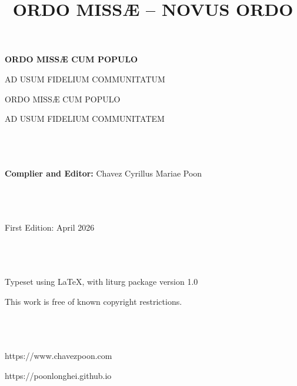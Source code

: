 \documentclass[12pt, a4paper]{article}
\title{ORDO MISSÆ -- NOVUS ORDO}
\date{}
\begin{document}
	\begin{titlepage}
		\centering
		\vspace*{3cm}
		{\Huge\bfseries ORDO MISSÆ CUM POPULO\par}
		\vspace{5cm}
		{\large AD USUM FIDELIUM COMMUNITATUM\par}
		\vfill
	\end{titlepage}
	
	\newpage
	
	\setlength{\leftskip}{0cm}
	
	{\LARGE ORDO MISSÆ CUM POPULO}
	\\
	\setlength{\leftskip}{0cm}
	
	{\large AD USUM FIDELIUM COMMUNITATEM}
	\\\\
	\\\\
	\setlength{\leftskip}{0cm}
	
	{\large \textbf{Complier and Editor:} Chavez Cyrillus Mariae Poon}
	\\\\
	\\\\
	\setlength{\leftskip}{0cm}
	
	{\large First Edition: April 2026}
	\\\\
	\\\\
	\setlength{\leftskip}{0cm}
	
	{\large Typeset using \LaTeX, with liturg package version 1.0}
	\\
	\setlength{\leftskip}{0cm}
	
	{\large This work is free of known copyright restrictions.}
	\\\\
	\\\\
	\setlength{\leftskip}{0cm}
	
	{\large https://www.chavezpoon.com}
	\\
	\setlength{\leftskip}{0cm}
	
	{\large https://poonlonghei.github.io}
	
	\newpage
	
\end{document}
